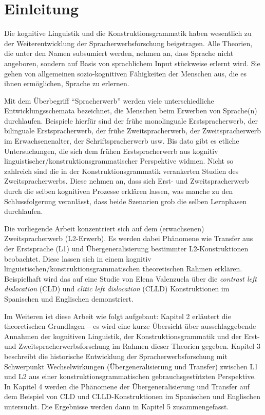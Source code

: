 \section{Einleitung}

\begin{comment}
* ca 3/4 Seiten
* Untersuchungsgegenstand
* Erkenntnisinteresse
* Forschungsstand
* Vorgehensweise: also Section 2 macht blabla, Section 3 blablup, ....
* Ergebnisse können/sollen angedeuten werden
\end{comment}

Die kognitive Linguistik und die Konstruktionsgrammatik haben wesentlich zu der Weiterentwicklung der Spracherwerbsforschung beigetragen.
Alle Theorien, die unter den Namen subsumiert werden, nehmen an, dass Sprache nicht angeboren, sondern auf Basis von sprachlichem Input stückweise erlernt wird.
Sie gehen von allgemeinen sozio-kognitiven Fähigkeiten der Menschen aus, die es ihnen ermöglichen, Sprache zu erlernen.

Mit dem Überbegriff ``Spracherwerb'' werden viele unterschiedliche Entwicklungsschemata bezeichnet, die Menschen beim Erwerben von Sprache(n) durchlaufen.
Beispiele hierfür sind der frühe monolinguale Erstspracherwerb, der bilinguale Erstspracherwerb, der frühe Zweitspracherwerb, der Zweitspracherwerb im Erwachsenenalter, der Schriftspracherwerb usw.
Bis dato gibt es etliche Untersuchungen, die sich dem frühen Erstspracherwerb aus kognitiv linguistischer/konstruktionsgrammatischer Perspektive widmen.
Nicht so zahlreich sind die in der Konstruktionsgrammatik verankerten Studien des Zweitspracherwerbs.
Diese nehmen an, dass sich Erst- und Zweitspracherwerb durch die selben kognitiven Prozesse erklären lassen, was manche zu den Schlussfolgerung veranlässt, dass beide Szenarien grob die selben Lernphasen durchlaufen.

Die vorliegende Arbeit konzentriert sich auf dem (erwachsenen) Zweitspracherwerb (L2-Erwerb).
Es werden dabei Phänomene wie Transfer aus der Erstsprache (L1) und Übergeneralisierung bestimmter L2-Konstruktionen beobachtet.
Diese lassen sich in einem kognitiv linguistischen/konstruktionsgrammatischen theoretischen Rahmen erklären.
Beispielhaft wird das auf eine Studie von Elena Valenzuela \cite{Valenzuela05} über die \textit{contrast left dislocation} (CLD) und \textit{clitic left dislocation} (CLLD) Konstruktionen im Spanischen und Englischen demonstriert.

Im Weiteren ist diese Arbeit wie folgt aufgebaut:
Kapitel 2 erläutert die theoretischen Grundlagen -- es wird eine kurze Übersicht über ausschlaggebende Annahmen der kognitiven Linguistik, der Konstruktionsgrammatik und der Erst- und Zweitspracherwerbsforschung im Rahmen dieser Theorien gegeben.
Kapitel 3 beschreibt die historische Entwicklung der Spracherwerbsforschung mit Schwerpunkt Wechselwirkungen (Übergeneralisierung und Transfer) zwischen L1 und L2 aus einer konstruktionsgrammatischen gebrauchsgestützten Perspektive.
In Kapitel 4 werden die Phänomene der Übergeneralisierung und Transfer auf dem Beispiel von CLD und CLLD-Konstruktionen im Spanischen und Englischen untersucht.
Die Ergebnisse werden dann in Kapitel 5 zusammengefasst. %
